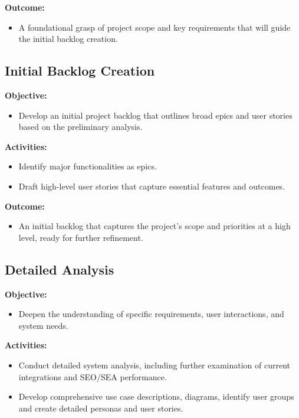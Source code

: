 \documentclass[12pt,a4paper]{article}
\begin{document}
\noindent \textbf{Outcome:}
\begin{itemize}
    \item A foundational grasp of project scope and key requirements that will guide the initial backlog creation.
\end{itemize}


\subsection{Initial Backlog Creation}

\noindent \textbf{Objective:}
\begin{itemize}
    \item Develop an initial project backlog that outlines broad epics and user stories based on the preliminary analysis.
\end{itemize}

\noindent \textbf{Activities:}
\begin{itemize}
    \item Identify major functionalities as epics.
    \item Draft high-level user stories that capture essential features and outcomes.
\end{itemize}

\noindent \textbf{Outcome:}
\begin{itemize}
    \item An initial backlog that captures the project's scope and priorities at a high level, ready for further refinement.
\end{itemize}
\subsection{Detailed Analysis}

\noindent \textbf{Objective:}
\begin{itemize}
    \item Deepen the understanding of specific requirements, user interactions, and system needs.
\end{itemize}

\noindent \textbf{Activities:}
\begin{itemize}
    \item Conduct detailed system analysis, including further examination of current integrations and SEO/SEA performance.
    \item Develop comprehensive use case descriptions, diagrams, identify user groups and create detailed personas and user stories.
\end{itemize}
\end{document}
